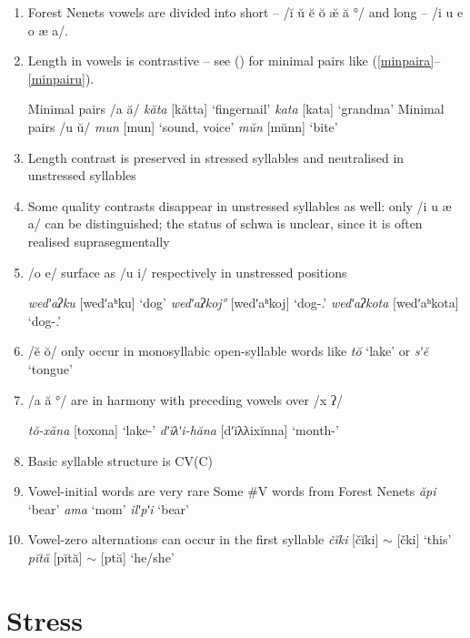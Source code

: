\documentclass[a4paper, 12pt]{article}
\newcommand{\citeay}[2][]{
   \citeauthor{#2} (\citeyear[#1]{#2})}
\begin{document}
	\begin{enumerate}[$\gg$]
		\item Forest Nenets vowels are divided into short – /ĭ ŭ ĕ ŏ æ̆ ă °/ and long – /i u e o æ a/.
		\item Length in vowels is contrastive -- see \citeay{sammallahti1974} for minimal pairs like (\ref{minpaira}--\ref{minpairu}).
		
	\pex\label{minpaira}Minimal pairs /a ă/ \parencite[p. 20]{sammallahti1974}
		\a \emph{kăta} [kătta] \hfill `fingernail'
		\a \emph{kata} [kata] \hfill `grandma'
	\xe
	\pex\label{minpairu}Minimal pairs /u ŭ/
		\a \emph{mun} [mun] \hfill `sound, voice'
		\a \emph{mŭn} [mŭnn] \hfill `bite'
	\xe
	
		\item Length contrast is preserved in stressed syllables and neutralised in unstressed syllables
		\item Some quality contrasts disappear in unstressed syllables as well: only /i u æ a/ can be distinguished; the status of schwa is unclear, since it is often realised suprasegmentally
		\item /o e/ surface as /u i/ respectively in unstressed positions
		
	\pex\label{}\a \emph{wedʹaʔku} [wedʹaʰku] \hfill `dog'
		\a \emph{wedʹaʔkoj°} [wedʹaʰkoj] \hfill `dog-{\Poss}.{\Fsg}'
		\a \emph{wedʹaʔkota} [wedʹaʰkota] \hfill `dog-{\Poss}.{\Tsg}'
	\xe
		
		\item /ĕ ŏ/ only occur in monosyllabic open-syllable words like \emph{tŏ} `lake’ or \emph{sʹĕ} `tongue’
		\item /a ă °/ are in harmony with preceding vowels over /x ʔ/

	\pex\label{assim}
		\a \emph{tŏ-xăna} [toxona] \hfill `lake-{\Loc}' 
		\a \emph{dʹĭλʹi-hăna} [dʹĭλλixĭnna] \hfill `month-{\Loc}'
	\xe
		\item Basic syllable structure is CV(C)
		\item Vowel-initial words are very rare
			\pex Some \#V words from Forest Nenets
				\a \emph{ăpi} \hfill `bear'
				\a \emph{ama} \hfill `mom' 
				\a \emph{ilʹpʹi} \hfill `bear'
			\xe
		\item Vowel-zero alternations can occur in the first syllable
			\pex
				\a \emph{čĭki} [čĭki] $\sim$ [čki] \hfill `this'
				\a \emph{pĭtă} [pĭtă] $\sim$ [ptă] \hfill `he/she'
			\xe
	\end{enumerate}

		\section{Stress}
	
\end{document}
